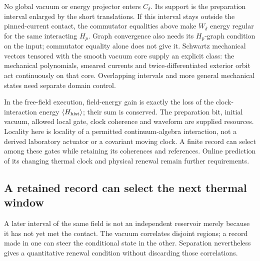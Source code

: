 No global vacuum or energy projector enters $C_\delta$. Its support
is the preparation interval enlarged by the short translations.
If this interval stays outside the pinned-current contact, the
commutator equalities above make $W_\delta$ energy regular for the
same interacting $H_p$. Graph convergence also needs its $H_p$-graph
condition on the input; commutator equality alone does not give it.
Schwartz mechanical vectors tensored with the smooth vacuum core
supply an explicit class: the mechanical polynomials, smeared currents
and twice-differentiated exterior orbit act continuously on that core.
Overlapping intervals and more general mechanical states need separate
domain control.

In the free-field execution, field-energy gain is exactly the loss of
the clock-interaction energy $\langle H_{\rm hist}\rangle$; their sum
is conserved. The preparation bit, initial vacuum, allowed local gate,
clock coherence and waveform are supplied resources. Locality here is
locality of a permitted continuum-algebra interaction, not a derived
laboratory actuator or a covariant moving clock. A finite record can
select among these gates while retaining its coherences and references.
Online prediction of its changing thermal clock and physical renewal
remain further requirements.

\subsection{A retained record can select the next thermal window}
\label{sec:record-thermal-renewal}

A later interval of the same field is not an independent reservoir
merely because it has not yet met the contact. The vacuum correlates
disjoint regions; a record made in one can steer the conditional
state in the other. Separation nevertheless gives a quantitative
renewal condition without discarding those correlations.

